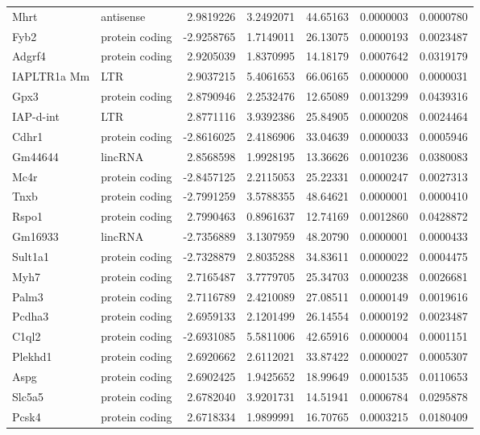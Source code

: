 \documentclass[onehalf,12pt]{beavtex}
\begin{document}
\begin{longtable}{llrrrrr}
  Mhrt & antisense & 2.9819226 & 3.2492071 & 44.65163 & 0.0000003 & 0.0000780\\
  Fyb2 & protein coding & -2.9258765 & 1.7149011 & 26.13075 & 0.0000193 & 0.0023487\\
  Adgrf4 & protein coding & 2.9205039 & 1.8370995 & 14.18179 & 0.0007642 & 0.0319179\\
  IAPLTR1a Mm & LTR & 2.9037215 & 5.4061653 & 66.06165 & 0.0000000 & 0.0000031\\
  \addlinespace
  Gpx3 & protein coding & 2.8790946 & 2.2532476 & 12.65089 & 0.0013299 & 0.0439316\\
  IAP-d-int & LTR & 2.8771116 & 3.9392386 & 25.84905 & 0.0000208 & 0.0024464\\
  Cdhr1 & protein coding & -2.8616025 & 2.4186906 & 33.04639 & 0.0000033 & 0.0005946\\
  Gm44644 & lincRNA & 2.8568598 & 1.9928195 & 13.36626 & 0.0010236 & 0.0380083\\
  Mc4r & protein coding & -2.8457125 & 2.2115053 & 25.22331 & 0.0000247 & 0.0027313\\
  \addlinespace
  Tnxb & protein coding & -2.7991259 & 3.5788355 & 48.64621 & 0.0000001 & 0.0000410\\
  Rspo1 & protein coding & 2.7990463 & 0.8961637 & 12.74169 & 0.0012860 & 0.0428872\\
  Gm16933 & lincRNA & -2.7356889 & 3.1307959 & 48.20790 & 0.0000001 & 0.0000433\\
  Sult1a1 & protein coding & -2.7328879 & 2.8035288 & 34.83611 & 0.0000022 & 0.0004475\\
  Myh7 & protein coding & 2.7165487 & 3.7779705 & 25.34703 & 0.0000238 & 0.0026681\\
  \addlinespace
  Palm3 & protein coding & 2.7116789 & 2.4210089 & 27.08511 & 0.0000149 & 0.0019616\\
  Pcdha3 & protein coding & 2.6959133 & 2.1201499 & 26.14554 & 0.0000192 & 0.0023487\\
  C1ql2 & protein coding & -2.6931085 & 5.5811006 & 42.65916 & 0.0000004 & 0.0001151\\
  Plekhd1 & protein coding & 2.6920662 & 2.6112021 & 33.87422 & 0.0000027 & 0.0005307\\
  Aspg & protein coding & 2.6902425 & 1.9425652 & 18.99649 & 0.0001535 & 0.0110653\\
  \addlinespace
  Slc5a5 & protein coding & 2.6782040 & 3.9201731 & 14.51941 & 0.0006784 & 0.0295878\\
  Pcsk4 & protein coding & 2.6718334 & 1.9899991 & 16.70765 & 0.0003215 & 0.0180409\\

\end{longtable}
\end{document}
